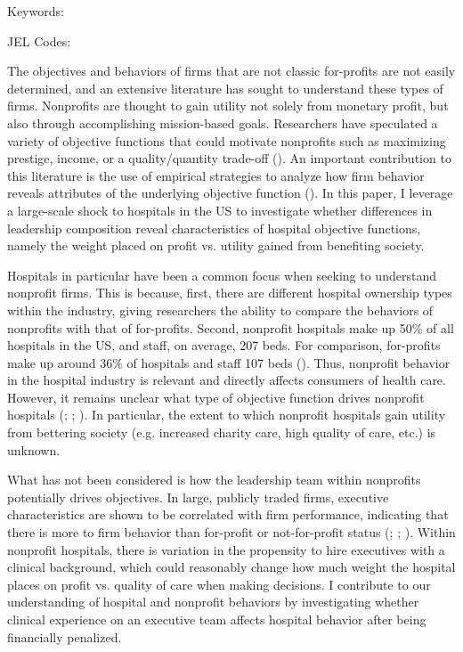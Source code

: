 \documentclass[12pt]{article}
\begin{document}
	
	
	
	\vspace{0.8in}
	
	\noindent Keywords: 
	
	\noindent JEL Codes: 
	
	\onehalfspacing
	
	\newpage

  The objectives and behaviors of firms that are not classic for-profits are not easily determined, and an extensive literature has sought to understand these types of firms. Nonprofits are thought to gain utility not solely from monetary profit, but also through accomplishing mission-based goals. Researchers have speculated a variety of objective functions that could motivate nonprofits such as maximizing prestige, income, or a quality/quantity trade-off (\cite{steinberg1986revealed}). An important contribution to this literature is the use of empirical strategies to analyze how firm behavior reveals attributes of the underlying objective function (\cite{sloan2000not}). In this paper, I leverage a large-scale shock to hospitals in the US to investigate whether differences in leadership composition reveal characteristics of hospital objective functions, namely the weight placed on profit vs. utility gained from benefiting society.
  
  Hospitals in particular have been a common focus when seeking to understand nonprofit firms. This is because, first, there are different hospital ownership types within the industry, giving researchers the ability to compare the behaviors of nonprofits with that of for-profits. Second, nonprofit hospitals make up 50\% of all hospitals in the US, and staff, on average, 207 beds. For comparison, for-profits make up around 36\% of hospitals and staff 107 beds (\cite{ASPE_2023}). Thus, nonprofit behavior in the hospital industry is relevant and directly affects consumers of health care. However, it remains unclear what type of objective function drives nonprofit hospitals (\cite{erus2002inferring}; \cite{deneffe2002not}; \cite{horwitz2009hospital}). In particular, the extent to which nonprofit hospitals gain utility from bettering society (e.g. increased charity care, high quality of care, etc.) is unknown. 
  
  What has not been considered is how the leadership team within nonprofits potentially drives objectives. In large, publicly traded firms, executive characteristics are shown to be correlated with firm performance, indicating that there is more to firm behavior than for-profit or not-for-profit status (\cite{bertrand2003managing}; \cite{matsa2013female}; \cite{ahern2012changing}). Within nonprofit hospitals, there is variation in the propensity to hire executives with a clinical background, which could reasonably change how much weight the hospital places on profit vs. quality of care when making decisions. I contribute to our understanding of hospital and nonprofit behaviors by investigating whether clinical experience on an executive team affects hospital behavior after being financially penalized.
\end{document}
